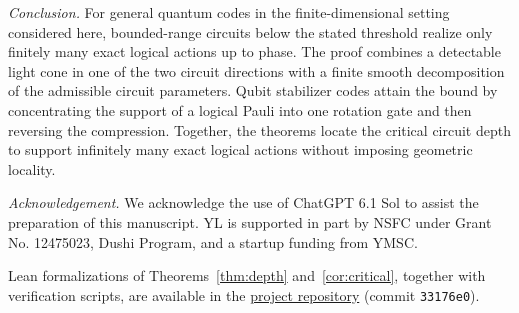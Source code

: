\documentclass[aps,prl,reprint,notitlepage,nofootinbib,nobibnotes]{revtex4-2}
\begin{document}
\textit{Conclusion.}
For general quantum codes in the finite-dimensional setting considered
here, bounded-range circuits below the stated threshold realize only
finitely many exact logical actions up to phase. The proof combines a
detectable light cone in one of the two circuit directions with a
finite smooth decomposition of the admissible circuit parameters.
Qubit stabilizer codes attain the bound by concentrating the support
of a logical Pauli into one rotation gate and then reversing the
compression. Together, the theorems locate the critical circuit depth to support
infinitely many exact logical actions without imposing geometric
locality.

\begin{acknowledgments}
\textit{Acknowledgement.} We acknowledge the use of ChatGPT 6.1 Sol to assist the preparation of this manuscript. YL is supported in part
by NSFC under Grant No. 12475023, Dushi Program, and a startup funding from YMSC.
\end{acknowledgments}

Lean formalizations of Theorems~\ref{thm:depth} and~\ref{cor:critical}, together with verification scripts, are available in the \href{https://github.com/Imine20/critical-depth-for-the-infinite-logical-set/tree/33176e0000d326ed22ccdf79db5d18d8e09c811a}{project repository} (commit \texttt{33176e0}).
\end{document}
